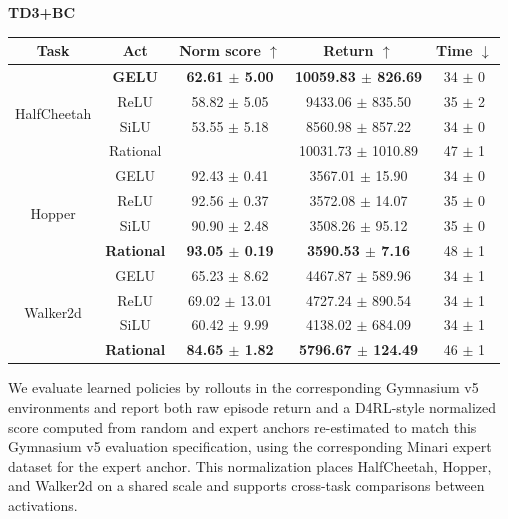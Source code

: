 \documentclass{article}
\theoremstyle{plain}
\theoremstyle{definition}
\theoremstyle{remark}
\begin{document}
\begin{table}[t]
\begin{minipage}[t]{0.49\textwidth}
\begin{tabular}{@{}ccccc@{}}
\bottomrule
\end{tabular}
\end{minipage}\hfill
\begin{minipage}[t]{0.49\textwidth}
\centering
\textbf{TD3+BC}\par\vspace{0.25em}
\begin{tabular}{@{}ccccc@{}}
\toprule
Task & Act & Norm score $\uparrow$ & Return $\uparrow$ & Time $\downarrow$ \\
\midrule
\multirow{4}{*}{HalfCheetah} &\textbf{GELU }& \cellcolor{green!22}\textbf{62.61 $\pm$ 5.00 }& \cellcolor{green!22} \textbf{10059.83 $\pm$ 826.69} & 34 $\pm$ 0 \\
& ReLU & 58.82 $\pm$ 5.05 & 9433.06 $\pm$ 835.50 & 35 $\pm$ 2 \\
& SiLU & 53.55 $\pm$ 5.18 & 8560.98 $\pm$ 857.22 & 34 $\pm$ 0 \\
& {Rational} & \cellcolor{orange!22}{62.44 $\pm$ 6.11} & \cellcolor{orange!22} 10031.73 $\pm$ 1010.89 & 47 $\pm$ 1 \\
\midrule
\multirow{4}{*}{Hopper} & GELU & 92.43 $\pm$ 0.41 & 3567.01 $\pm$ 15.90 & 34 $\pm$ 0 \\
& ReLU & \cellcolor{orange!22}92.56 $\pm$ 0.37 & \cellcolor{orange!22}3572.08 $\pm$ 14.07 & 35 $\pm$ 0 \\
& SiLU & 90.90 $\pm$ 2.48 & 3508.26 $\pm$ 95.12 & 35 $\pm$ 0 \\
& \textbf{Rational} & \cellcolor{green!22}\textbf{93.05 $\pm$ 0.19} & \cellcolor{green!22}\textbf{3590.53 $\pm$ 7.16} & 48 $\pm$ 1 \\
\midrule
\multirow{4}{*}{Walker2d} & GELU & 65.23 $\pm$ 8.62 & 4467.87 $\pm$ 589.96 & 34 $\pm$ 1 \\
& ReLU & \cellcolor{orange!22}69.02 $\pm$ 13.01 & \cellcolor{orange!22} 4727.24 $\pm$ 890.54 & 34 $\pm$ 1 \\
& SiLU & 60.42 $\pm$ 9.99 & 4138.02 $\pm$ 684.09 & 34 $\pm$ 1 \\
& \textbf{Rational} & \cellcolor{green!22}\textbf{84.65 $\pm$ 1.82} & \cellcolor{green!22} \textbf{5796.67 $\pm$ 124.49} & 46 $\pm$ 1 \\
\bottomrule
\end{tabular}
\end{minipage}
\endgroup
\end{table}
We evaluate learned policies by rollouts in the corresponding Gymnasium v5 environments \cite{gymnasium} and report both raw episode return and a D4RL-style normalized score \cite{fu2020d4rl} computed from random and expert anchors re-estimated to match this Gymnasium v5 evaluation specification, using the corresponding Minari expert dataset for the expert anchor. This normalization places HalfCheetah, Hopper, and Walker2d on a shared scale and supports cross-task comparisons between activations.
\end{document}
